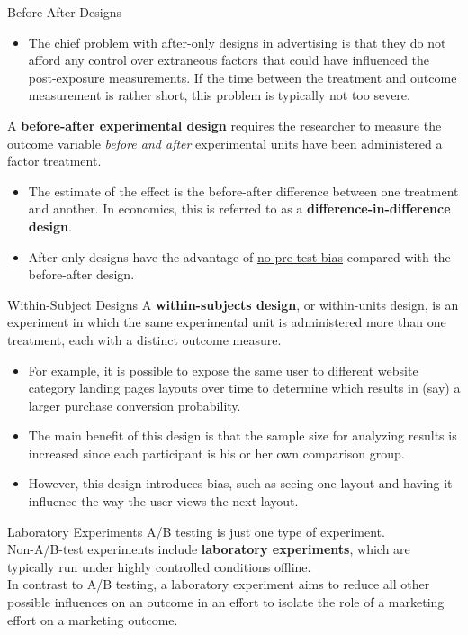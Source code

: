 \documentclass[pdf]{beamer}
\newcommand{\empr}[1]{{\color{franklinblue}\textbf{#1}}}
\theoremstyle{remark}
\theoremstyle{definition}
\begin{document}
\begin{frame}[t]{Before-After Designs}
\begin{itemize}
\item The chief problem with after-only designs in advertising is that they do not afford any control over extraneous factors that could have influenced the post-exposure measurements.  If the time between the treatment and outcome measurement is rather short, this problem is typically not too severe.
\end{itemize}
A \empr{before-after experimental design} requires the researcher to measure the outcome variable \textit{before and after} experimental units have been administered a factor treatment. \\
\vspace{1.5ex}
\begin{itemize}
  \item  The estimate of the effect is the before-after difference between one treatment and another. In economics, this is referred to as a \empr{difference-in-difference design}. 
  \item After-only designs have the advantage of \underline{no pre-test bias} compared with the before-after design.
\end{itemize}
\end{frame}

\begin{frame}[t]{Within-Subject Designs}
\vspace{1.5ex}
A \empr{within-subjects design}, or within-units design, is an experiment in which the same experimental unit is administered more than one treatment, each with a distinct outcome measure.
\begin{itemize}
\item For example, it is possible to expose the same user to different website category landing pages layouts over time to determine which results in (say) a larger purchase conversion probability. 
\item The main benefit of this design is that the sample size for analyzing results is increased since each participant is his or her own comparison group. 
\item However, this design introduces bias, such as seeing one layout and having it influence the way the user views the next layout. 
\end{itemize}
\end{frame}

\begin{frame}[t]{Laboratory Experiments}
A/B testing is just one type of experiment. \\
\vspace{1.5ex}
Non-A/B-test experiments include \empr{laboratory experiments}, which are typically run under highly controlled conditions offline. \\
\vspace{1.5ex}
In contrast to A/B testing, a laboratory experiment aims to reduce all other possible influences on an outcome in an effort to isolate the role of a marketing effort on a marketing outcome. \\
\end{frame}
\end{document}
